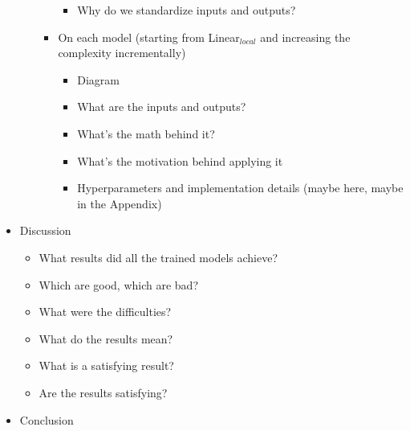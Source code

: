 \begin{itemize}
\begin{itemize}
\begin{itemize}
\begin{itemize}
                \item Why do we standardize inputs and outputs?
            \end{itemize}
            \item On each model (starting from Linear$_{local}$ and increasing the complexity incrementally)
            \begin{itemize}
                \item Diagram
                \item What are the inputs and outputs?
                \item What's the math behind it?
                \item What's the motivation behind applying it
                \item Hyperparameters and implementation details (maybe here, maybe in the Appendix)
            \end{itemize}
        \end{itemize}
    \end{itemize}
    \item Discussion
    \begin{itemize}
        \item What results did all the trained models achieve?
        \item Which are good, which are bad?
        \item What were the difficulties?
        \item What do the results mean?
        \item What is a satisfying result?
        \item Are the results satisfying?
    \end{itemize}
    \item Conclusion
\end{itemize}
